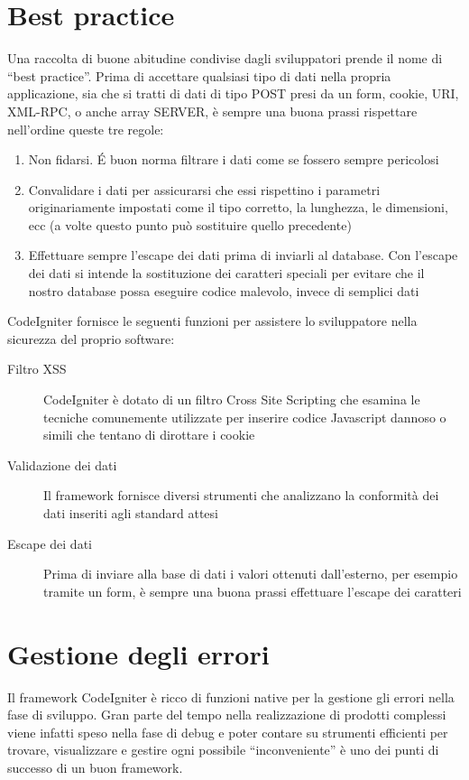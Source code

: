 \section*{Best practice}
Una raccolta di buone abitudine condivise dagli sviluppatori prende il nome di ``best practice''. Prima di accettare qualsiasi tipo di dati nella propria applicazione, sia che si tratti di dati di tipo POST presi da un form, cookie, URI, XML-RPC, o anche array SERVER, è sempre una buona prassi rispettare nell'ordine queste tre regole:

\begin{enumerate}
\item Non fidarsi. \'E buon norma filtrare i dati come se fossero sempre pericolosi
\item Convalidare i dati per assicurarsi che essi rispettino i parametri originariamente impostati come il tipo corretto, la lunghezza, le dimensioni, ecc (a volte questo punto può sostituire quello precedente)
\item Effettuare sempre l'escape dei dati prima di inviarli al database. Con l'escape dei dati si intende la sostituzione dei caratteri speciali per evitare che il nostro database possa eseguire codice malevolo, invece di semplici dati
\end{enumerate}

CodeIgniter fornisce le seguenti funzioni per assistere lo sviluppatore nella sicurezza del proprio software:

\begin{description}
\item[Filtro XSS] CodeIgniter è dotato di un filtro Cross Site Scripting che esamina le tecniche comunemente utilizzate per inserire codice Javascript dannoso o simili che tentano di dirottare i cookie 
\item[Validazione dei dati] Il framework fornisce diversi strumenti che analizzano la conformità dei dati inseriti agli standard attesi
\item[Escape dei dati] Prima di inviare alla base di dati i valori ottenuti dall'esterno, per esempio tramite un form, è sempre una buona prassi effettuare l'escape dei caratteri
\end{description}

\section*{Gestione degli errori}
Il framework CodeIgniter è ricco di funzioni native per la gestione gli errori nella fase di sviluppo. Gran parte del tempo nella realizzazione di prodotti complessi viene infatti speso nella fase di debug e poter contare su strumenti efficienti per trovare, visualizzare e gestire ogni possibile ``inconveniente'' è uno dei punti di successo di un buon framework. 

